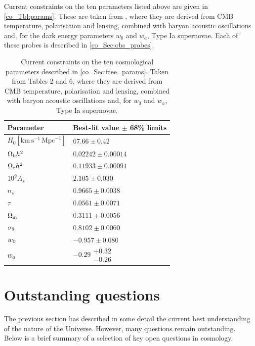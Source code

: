 Current constraints on the ten parameters listed above are given in \autoref{co_Tbl:params}. These are taken from \citet{Planck2018VI}, where they are derived from CMB temperature, polarisation and lensing, combined with baryon acoustic oscillations and, for the dark energy parameters $w_0$ and $w_a$, Type Ia supernovae. Each of these probes is described in \autoref{co_Sec:obs_probes}.

\begin{table}
\caption{Current constraints on the ten cosmological parameters described in \autoref{co_Sec:free_params}. Taken from \citet{Planck2018VI} Tables 2 and 6, where they are derived from CMB temperature, polarisation and lensing, combined with baryon acoustic oscillations and, for $w_0$ and $w_a$, Type Ia supernovae.}
\label{co_Tbl:params}
\vspace{.5em} %
\centering
\bgroup
\def\arraystretch{1.5}
\begin{tabular}{ll}
Parameter & Best-fit value $\pm$ 68\% limits \\
\hline
$H_0 \left[ \text{km}\,\text{s}^{-1}\,\text{Mpc}^{-1} \right]$
& $67.66 \pm 0.42$ \\
$\Omega_\text{b} h^2$ & $0.02242 \pm 0.00014$ \\
$\Omega_\text{c} h^2$ & $0.11933 \pm 0.00091$ \\
$10^9 A_s$ & $2.105 \pm 0.030$  \\
$n_s$ & $0.9665 \pm 0.0038$ \\
$\tau$ & $0.0561 \pm 0.0071$ \\
\hline
$\Omega_\text{m}$ & $0.3111 \pm 0.0056$ \\
$\sigma_8$ & $0.8102 \pm 0.0060$ \\
\hline
$w_0$ & $-0.957 \pm 0.080$ \\
$w_a$ & $-0.29\substack{+0.32 \\ -0.26}$
\end{tabular}
\egroup
\end{table}

\section{Outstanding questions}
\label{co_Sec:open_questions}

The previous section has described in some detail the current best understanding of the nature of the Universe. However, many questions remain outstanding. Below is a brief summary of a selection of key open questions in cosmology.

